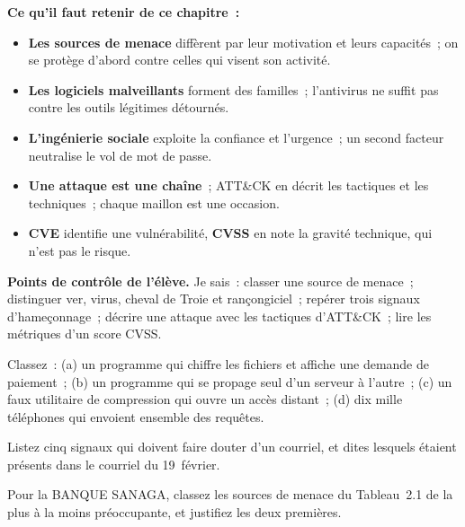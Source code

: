 \begin{boxresume}
\textbf{Ce qu'il faut retenir de ce chapitre~:}
\begin{itemize}
    \item \textbf{Les sources de menace} diffèrent par leur motivation et
          leurs capacités~; on se protège d'abord contre celles qui visent
          son activité.
    \item \textbf{Les logiciels malveillants} forment des familles~;
          l'antivirus ne suffit pas contre les outils légitimes détournés.
    \item \textbf{L'ingénierie sociale} exploite la confiance et l'urgence~;
          un second facteur neutralise le vol de mot de passe.
    \item \textbf{Une attaque est une chaîne}~; ATT\&CK en décrit les
          tactiques et les techniques~; chaque maillon est une occasion.
    \item \textbf{CVE} identifie une vulnérabilité, \textbf{CVSS} en note
          la gravité technique, qui n'est pas le risque.
\end{itemize}
\end{boxresume}

\begin{boxinfo}
\textbf{Points de contrôle de l'élève.} Je sais~: classer une source de
menace~; distinguer ver, virus, cheval de Troie et rançongiciel~; repérer
trois signaux d'hameçonnage~; décrire une attaque avec les tactiques
d'ATT\&CK~; lire les métriques d'un score CVSS.
\end{boxinfo}

\bigskip

\begin{boxexo}[title={\ding{45}\quad Exercice~2.1. Quelle famille~? \niveaubase}]
Classez~: (a) un programme qui chiffre les fichiers et affiche une
demande de paiement~; (b) un programme qui se propage seul d'un serveur à
l'autre~; (c) un faux utilitaire de compression qui ouvre un accès
distant~; (d) dix mille téléphones qui envoient ensemble des requêtes.
\end{boxexo}

\begin{boxexo}[title={\ding{45}\quad Exercice~2.2. Les signaux \niveaubase}]
Listez cinq signaux qui doivent faire douter d'un courriel, et dites
lesquels étaient présents dans le courriel du 19~février.
\end{boxexo}

\begin{boxexo}[title={\ding{45}\quad Exercice~2.3. Les sources \niveaubase}]
Pour la BANQUE SANAGA, classez les sources de menace du Tableau~2.1 de la
plus à la moins préoccupante, et justifiez les deux premières.
\end{boxexo}

